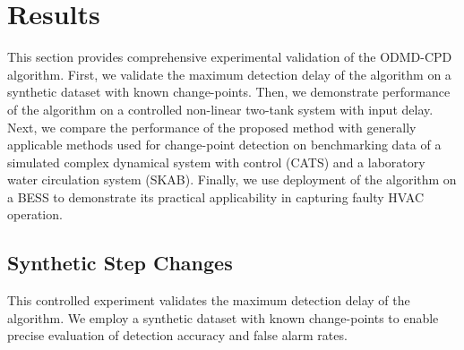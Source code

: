 \section{Results}\label{sec:results}
This section provides comprehensive experimental validation of the ODMD-CPD algorithm. First, we validate the maximum detection delay of the algorithm on a synthetic dataset with known change-points. Then, we demonstrate performance of the algorithm on a controlled non-linear two-tank system with input delay. Next, we compare the performance of the proposed method with generally applicable methods used for change-point detection on benchmarking data of a simulated complex dynamical system with control (CATS) and a laboratory water circulation system (SKAB). Finally, we use deployment of the algorithm on a BESS to demonstrate its practical applicability in capturing faulty HVAC operation.



\subsection{Synthetic Step Changes}\label{sec:synthetic-validation}

This controlled experiment validates the maximum detection delay of the algorithm. We employ a synthetic dataset with known change-points to enable precise evaluation of detection accuracy and false alarm rates.

